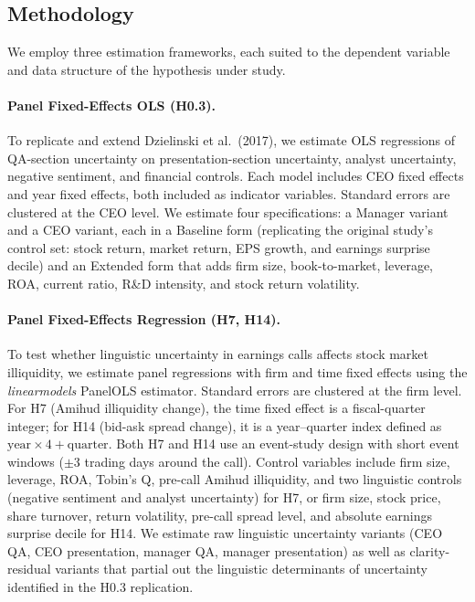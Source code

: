 \documentclass[12pt,a4paper]{article}
\begin{document}
\subsection{Methodology}
\label{sec:methodology}

We employ three estimation frameworks, each suited to the dependent variable and data structure of the hypothesis under study.

\paragraph{Panel Fixed-Effects OLS (H0.3).}
To replicate and extend Dzielinski et al.\ (2017), we estimate OLS regressions of QA-section uncertainty on presentation-section uncertainty, analyst uncertainty, negative sentiment, and financial controls. Each model includes CEO fixed effects and year fixed effects, both included as indicator variables. Standard errors are clustered at the CEO level. We estimate four specifications: a Manager variant and a CEO variant, each in a Baseline form (replicating the original study's control set: stock return, market return, EPS growth, and earnings surprise decile) and an Extended form that adds firm size, book-to-market, leverage, ROA, current ratio, R\&D intensity, and stock return volatility.

\paragraph{Panel Fixed-Effects Regression (H7, H14).}
To test whether linguistic uncertainty in earnings calls affects stock market illiquidity, we estimate panel regressions with firm and time fixed effects using the \textit{linearmodels} PanelOLS estimator. Standard errors are clustered at the firm level. For H7 (Amihud illiquidity change), the time fixed effect is a fiscal-quarter integer; for H14 (bid-ask spread change), it is a year--quarter index defined as $\text{year} \times 4 + \text{quarter}$. Both H7 and H14 use an event-study design with short event windows ($\pm$3 trading days around the call). Control variables include firm size, leverage, ROA, Tobin's Q, pre-call Amihud illiquidity, and two linguistic controls (negative sentiment and analyst uncertainty) for H7, or firm size, stock price, share turnover, return volatility, pre-call spread level, and absolute earnings surprise decile for H14. We estimate raw linguistic uncertainty variants (CEO QA, CEO presentation, manager QA, manager presentation) as well as clarity-residual variants that partial out the linguistic determinants of uncertainty identified in the H0.3 replication.
\end{document}
